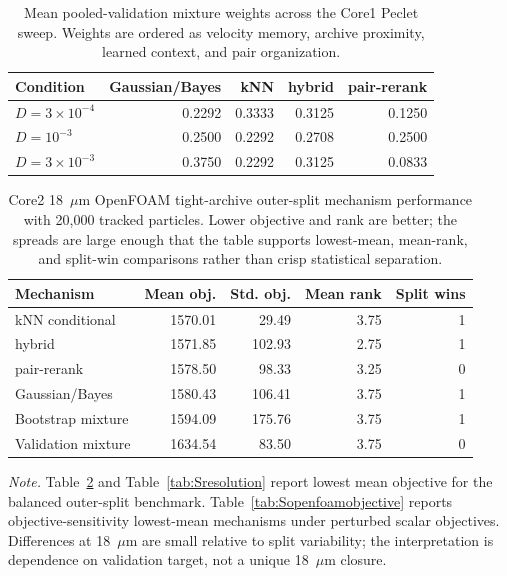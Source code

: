 \documentclass[11pt]{article}
\newcommand{\gb}{Gaussian/Bayes}
\newcommand{\knn}{kNN}
\newcommand{\hybrid}{hybrid}
\newcommand{\pair}{pair-rerank}
\begin{document}
\begin{table}[!htbp]
\centering
\caption{Mean pooled-validation mixture weights across the Core1 Peclet sweep. Weights are ordered as velocity memory, archive proximity, learned context, and pair organization.}
\label{tab:Speclet}
\small
\begin{tabular}{lrrrr}
\toprule
Condition & \gb{} & \knn{} & \hybrid{} & \pair{} \\
\midrule
$D=3\times 10^{-4}$ & 0.2292 & 0.3333 & 0.3125 & 0.1250 \\
$D=10^{-3}$ & 0.2500 & 0.2292 & 0.2708 & 0.2500 \\
$D=3\times 10^{-3}$ & 0.3750 & 0.2292 & 0.3125 & 0.0833 \\
\bottomrule
\end{tabular}
\end{table}

\begin{table}[!htbp]
\centering
\caption{Core2 18~$\mu$m OpenFOAM tight-archive outer-split mechanism performance with 20,000 tracked particles. Lower objective and rank are better; the spreads are large enough that the table supports lowest-mean, mean-rank, and split-win comparisons rather than crisp statistical separation.}
\label{tab:Sopenfoam}
\small
\begin{tabular}{lrrrr}
\toprule
Mechanism & Mean obj. & Std. obj. & Mean rank & Split wins \\
\midrule
\knn{} conditional & 1570.01 & 29.49 & 3.75 & 1 \\
\hybrid{} & 1571.85 & 102.93 & 2.75 & 1 \\
\pair{} & 1578.50 & 98.33 & 3.25 & 0 \\
\gb{} & 1580.43 & 106.41 & 3.75 & 1 \\
Bootstrap mixture & 1594.09 & 175.76 & 3.75 & 1 \\
Validation mixture & 1634.54 & 83.50 & 3.75 & 0 \\
\bottomrule
\end{tabular}
\par\vspace{0.45em}
{\footnotesize\textit{Note.} Table~\ref{tab:Sopenfoam} and Table~\ref{tab:Sresolution} report lowest mean objective for the balanced outer-split benchmark. Table~\ref{tab:Sopenfoamobjective} reports objective-sensitivity lowest-mean mechanisms under perturbed scalar objectives. Differences at 18~$\mu$m are small relative to split variability; the interpretation is dependence on validation target, not a unique 18~$\mu$m closure.\par}
\end{table}
\end{document}
